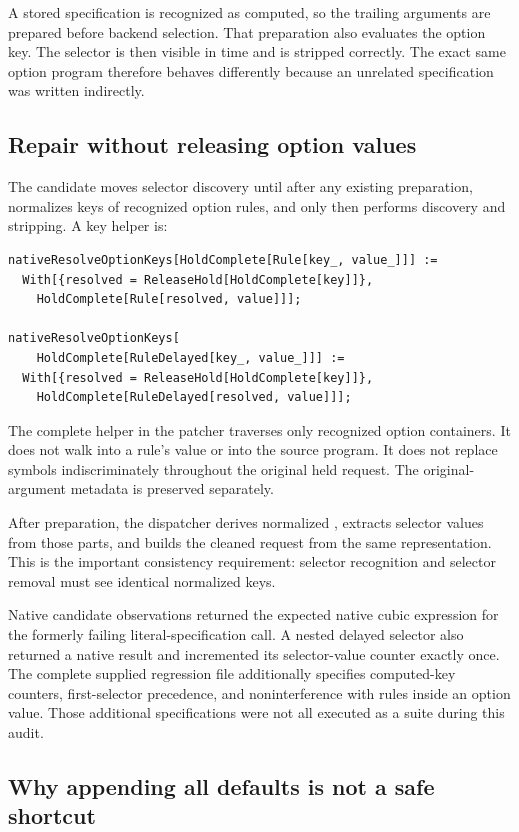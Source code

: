 \documentclass[11pt,letterpaper]{article}
\newcommand{\code}[1]{\texttt{\detokenize{#1}}}
\begin{document}
A stored specification is recognized as computed, so the trailing arguments
are prepared before backend selection. That preparation also evaluates the
option key. The selector is then visible in time and is stripped correctly.
The exact same option program therefore behaves differently because an
unrelated specification was written indirectly.

\subsection{Repair without releasing option values}

The candidate moves selector discovery until after any existing preparation,
normalizes keys of recognized option rules, and only then performs discovery
and stripping. A key helper is:
\begin{lstlisting}
nativeResolveOptionKeys[HoldComplete[Rule[key_, value_]]] :=
  With[{resolved = ReleaseHold[HoldComplete[key]]},
    HoldComplete[Rule[resolved, value]]];

nativeResolveOptionKeys[
    HoldComplete[RuleDelayed[key_, value_]]] :=
  With[{resolved = ReleaseHold[HoldComplete[key]]},
    HoldComplete[RuleDelayed[resolved, value]]];
\end{lstlisting}
The complete helper in the patcher traverses only recognized option
containers. It does not walk into a rule's value or into the source program.
It does not replace symbols indiscriminately throughout the original held
request. The original-argument metadata is preserved separately.

After preparation, the dispatcher derives normalized \code{parts}, extracts
selector values from those parts, and builds the cleaned request from the
same representation. This is the important consistency requirement: selector
recognition and selector removal must see identical normalized keys.

Native candidate observations returned the expected native cubic expression
for the formerly failing literal-specification call. A nested delayed selector
also returned a native result and incremented its selector-value counter
exactly once. The complete supplied regression file additionally specifies
computed-key counters, first-selector precedence, and noninterference with
rules inside an option value. Those additional specifications were not all
executed as a suite during this audit.

\subsection{Why appending all defaults is not a safe shortcut}
\end{document}
